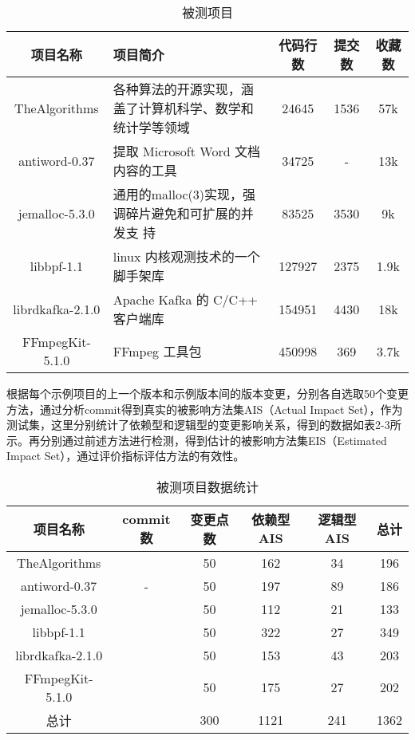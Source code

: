 \begin{table}[htbp]
\caption{被测项目}
\vspace{0.5em}\centering\wuhao
\begin{tabular}{cp{6cm}ccc}
\toprule
项目名称 & 项目简介 & 代码行数& 提交数 & 收藏数 \\
\midrule
TheAlgorithms & 各种算法的开源实现，涵盖了计算机科学、数学和统计学等领域 & 24645 & 1536 & 57k \\
antiword-0.37 & 提取 Microsoft Word 文档内容的工具 & 34725& - & 13k\\
jemalloc-5.3.0 & 通用的malloc(3)实现，强调碎片避免和可扩展的并发支
持  &83525& 3530 & 9k \\
libbpf-1.1 & linux 内核观测技术的一个脚手架库 & 127927 & 2375 & 1.9k \\
librdkafka-2.1.0& Apache Kafka 的 C/C++ 客户端库 & 154951 & 4430 & 18k \\
FFmpegKit-5.1.0 & FFmpeg 工具包 & 450998 & 369 & 3.7k \\

\bottomrule
\end{tabular}
\end{table}


根据每个示例项目的上一个版本和示例版本间的版本变更，分别各自选取50个变更方法，通过分析commit得到真实的被影响方法集AIS（Actual Impact Set），作为测试集，这里分别统计了依赖型和逻辑型的变更影响关系，得到的数据如表2-3所示。再分别通过前述方法进行检测，得到估计的被影响方法集EIS（Estimated Impact Set），通过评价指标评估方法的有效性。

\begin{table}[htbp]
\caption{被测项目数据统计}
\vspace{0.5em}\centering\wuhao
\begin{tabular}{cccccc}
\toprule
项目名称 & commit数 & 变更点数 & 依赖型AIS & 逻辑型AIS & 总计 \\
\midrule
TheAlgorithms &  & 50 & 162 & 34 & 196\\
antiword-0.37 & - & 50 & 197 & 89 & 186 \\
jemalloc-5.3.0 &   & 50 & 112 & 21 & 133 \\
libbpf-1.1 &  & 50 & 322 & 27 & 349 \\
librdkafka-2.1.0 &  & 50 & 153 & 43 & 203\\
FFmpegKit-5.1.0 &  & 50 & 175 & 27 & 202\\
总计 &  & 300 & 1121 & 241 & 1362 \\
\bottomrule
\end{tabular}
\end{table}


